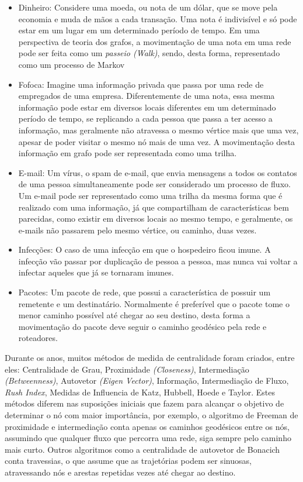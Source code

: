 \begin{itemize}
\item Dinheiro: Considere uma moeda, ou nota de um dólar, que se move pela
economia e muda de mãos a cada transação. Uma nota é indivisível e só pode estar
em um lugar em um determinado período de tempo. Em uma perspectiva de teoria dos
grafos, a movimentação de uma nota em uma rede pode ser feita como um \textit{passeio (Walk)},
sendo, desta forma, representado como um processo de Markov
\item Fofoca: Imagine uma informação privada que passa por uma rede
de empregados de uma empresa. Diferentemente de uma nota, essa mesma informação
pode estar em diversos locais diferentes em um determinado período de tempo, se
replicando a cada pessoa que passa a ter acesso a informação, mas geralmente
não atravessa o mesmo vértice mais que uma vez, apesar de poder visitar o mesmo nó
mais de uma vez. A movimentação desta informação em grafo pode ser representada como
uma trilha.
\item E-mail: Um vírus, o spam de e-mail, que envia mensagens a todos os
contatos de uma pessoa simultaneamente pode ser considerado um processo de fluxo.
Um e-mail pode ser representado como uma trilha da mesma forma que é realizado 
com uma informação, já que compartilham de características bem parecidas, como 
existir em diversos locais ao mesmo tempo, e geralmente, os e-mails não passarem
pelo mesmo vértice, ou caminho, duas vezes.
\item Infecções: O caso de uma infecção em que o hospedeiro ficou imune.
A infecção vão passar por duplicação de pessoa a pessoa, mas nunca vai voltar a infectar
aqueles que já se tornaram imunes.
\item Pacotes: Um pacote de rede, que possui a característica de possuir
um remetente e um destinatário. Normalmente é preferível que o pacote tome o menor
caminho possível até chegar ao seu destino, desta forma a movimentação do pacote
deve seguir o caminho geodésico pela rede e roteadores. 
\end{itemize}

Durante os anos, muitos métodos de medida de centralidade foram criados, entre eles:
Centralidade de Grau, Proximidade \textit{(Closeness)}, Intermediação \textit{(Betweenness)}, 
Autovetor \textit{(Eigen Vector)}, Informação, Intermediação de Fluxo, \textit{Rush Index},
Medidas de Influencia de Katz, Hubbell, Hoede e Taylor. Estes métodos diferem nas suposições
iniciais que fazem para alcançar o objetivo de determinar o nó com maior importância, por exemplo,
o algoritmo de Freeman de proximidade e intermediação conta apenas os caminhos geodésicos entre 
os nós, assumindo que qualquer fluxo que percorra uma rede, siga sempre pelo caminho mais curto.
Outros algoritmos como a centralidade de autovetor de Bonacich conta travessias, o que assume
que as trajetórias podem ser sinuosas, atravessando nós e arestas repetidas vezes até chegar ao
destino\cite{centrality}.

